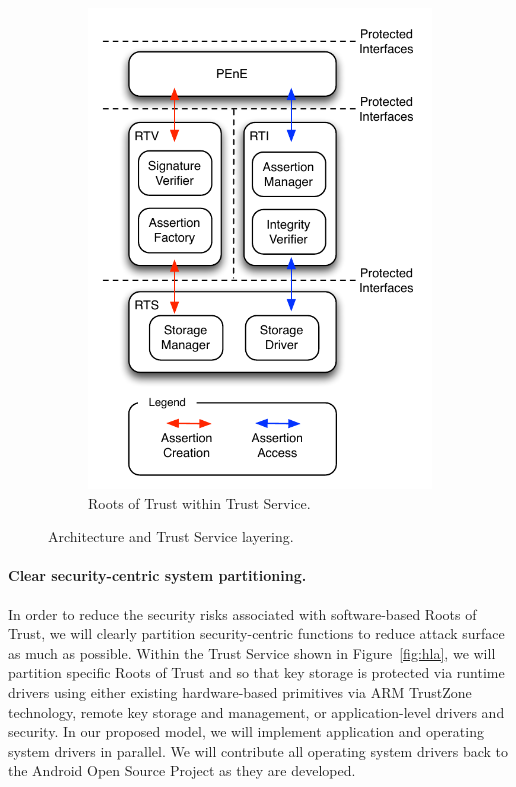 \documentclass[10pt,letterpaper]{article}
\begin{document}
\begin{figure}
\begin{subfigure}[b]{0.45\textwidth}
\includegraphics[width=\textwidth]{./images/layers.pdf}
\caption{Roots of Trust within Trust Service.}
\label{fig:layers}
\end{subfigure}
\caption{Architecture and Trust Service layering.}\label{fig:hla-layers}
\end{figure}

\paragraph{Clear security-centric system partitioning.}  In order to reduce the security risks associated with software-based Roots of Trust, we will clearly partition security-centric functions to reduce attack surface as much as possible. Within the Trust Service shown in Figure~\ref{fig:hla}, we will partition specific Roots of Trust and so that key storage is protected via runtime drivers using either existing hardware-based primitives via ARM TrustZone technology, remote key storage and management, or application-level drivers and security. In our proposed model, we will implement application and operating system drivers in parallel. We will contribute all operating system drivers back to the Android Open Source Project as they are developed.
\end{document}
